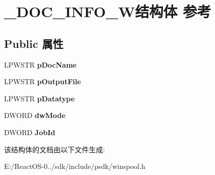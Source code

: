 \hypertarget{struct___d_o_c___i_n_f_o__2_w}{}\section{\+\_\+\+D\+O\+C\+\_\+\+I\+N\+F\+O\+\_\+W结构体 参考}
\label{struct___d_o_c___i_n_f_o__2_w}
\subsection*{Public 属性}
\begin{DoxyCompactItemize}
\item 
\mbox{\label{struct___d_o_c___i_n_f_o__2_w_ace63f7060dc4ece77cae4cdf80064f87}} 
L\+P\+W\+S\+TR {\bfseries p\+Doc\+Name}
\item 
\mbox{\label{struct___d_o_c___i_n_f_o__2_w_a8a7347e8273f2770a3ef0dd7623b6a55}} 
L\+P\+W\+S\+TR {\bfseries p\+Output\+File}
\item 
\mbox{\label{struct___d_o_c___i_n_f_o__2_w_af579fd10c738afd8f0c9bb7bb2eba2b7}} 
L\+P\+W\+S\+TR {\bfseries p\+Datatype}
\item 
\mbox{\label{struct___d_o_c___i_n_f_o__2_w_abd02a2624bfadb34603fd4ceda157c30}} 
D\+W\+O\+RD {\bfseries dw\+Mode}
\item 
\mbox{\label{struct___d_o_c___i_n_f_o__2_w_a0a3e05fc449bdc4fd23ff7e555b2f6b4}} 
D\+W\+O\+RD {\bfseries Job\+Id}
\end{DoxyCompactItemize}


该结构体的文档由以下文件生成\+:\begin{DoxyCompactItemize}
\item 
E\+:/\+React\+O\+S-\/0../sdk/include/psdk/winspool.\+h\end{DoxyCompactItemize}
